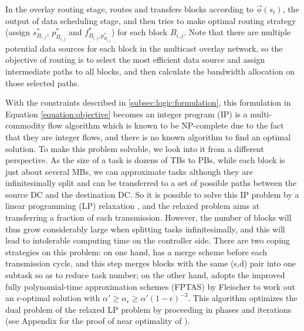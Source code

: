 In the overlay routing stage, \name routes and transfers blocks according to $\overrightarrow{o}(s_i)$, the output of data scheduling stage, and then tries to make optimal routing strategy (assign $s_{B_{i,j}}^*$, $p_{B_{i,j}}^*$ and $f^*_{B_{i,j},p_{B_{i,j}}^*}$) for each block $B_{i,j}$. Note that there are multiple potential data sources for each block in the multicast overlay network, so the objective of routing is to select the most efficient data source and assign intermediate paths to all blocks, and then calculate the bandwidth allocation on those selected paths.

With the constraints described in \Section\ref{subsec:logic:formulation}, this formulation in Equation \ref{equation:objective} becomes an integer program (IP) is a multi-commodity flow algorithm which is known to be NP-complete \cite{garg1997primal} due to the fact that they are integer flows, and there is no known algorithm to find an optimal solution. To make this problem solvable, we look into it from a different perspective. As the size of a task is dozens of TBs to PBs, while each block is just about several MBs, we can approximate tasks although they are infinitesimally split and can be transferred to a set of possible paths between the source DC and the destination DC. So it is possible to solve this IP problem by a linear programming (LP) relaxation \cite{garg2007faster,reed2012traffic}, and the relaxed problem aims at transferring a fraction of each transmission. However, the number of blocks will thus grow considerably large when splitting tasks infinitesimally, and this will lead to intolerable computing time on the controller side. There are two coping strategies on this problem: on one hand, \name has a merge scheme before each transmission cycle, and this step merges blocks with the same (s,d) pair into one subtask so as to reduce task number; on the other hand, \name adopts the improved fully polynomial-time approximation schemes (FPTAS) by Fleischer \cite{fleischer2000approximating} to work out an $\epsilon$-optimal solution with $\alpha' \geq \alpha_\epsilon \geq \alpha'(1-\epsilon)^{-3}$. This algorithm optimizes the dual problem of the relaxed LP problem by proceeding in phases and iterations (see Appendix for the proof of near optimality of \name).
